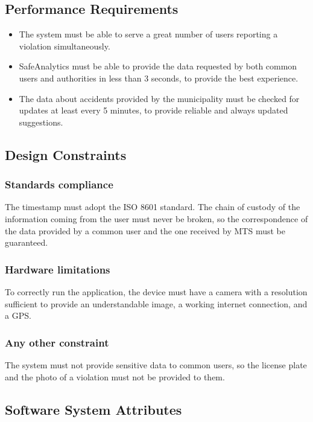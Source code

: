 \documentclass[a4paper]{article}
\begin{document}
\subsection{Performance Requirements}

\begin{itemize}
\item
  The system must be able to serve a great number of users reporting a
  violation simultaneously.
\item
  SafeAnalytics must be able to provide the data requested by both
  common users and authorities in less than 3 seconds, to provide the
  best experience.
\item
  The data about accidents provided by the municipality must be checked
  for updates at least every 5 minutes, to provide reliable and always
  updated suggestions.
\end{itemize}

\subsection{Design Constraints}

\subsubsection{Standards compliance}

The timestamp must adopt the ISO 8601 standard. The chain of custody of
the information coming from the user must never be broken, so the
correspondence of the data provided by a common user and the one
received by MTS must be guaranteed.

\subsubsection{Hardware limitations}

To correctly run the application, the device must have a camera with a
resolution sufficient to provide an understandable image, a working
internet connection, and a GPS.

\subsubsection{Any other constraint}

The system must not provide sensitive data to common users, so the
license plate and the photo of a violation must not be provided to them.

\subsection{Software System Attributes}
\end{document}
